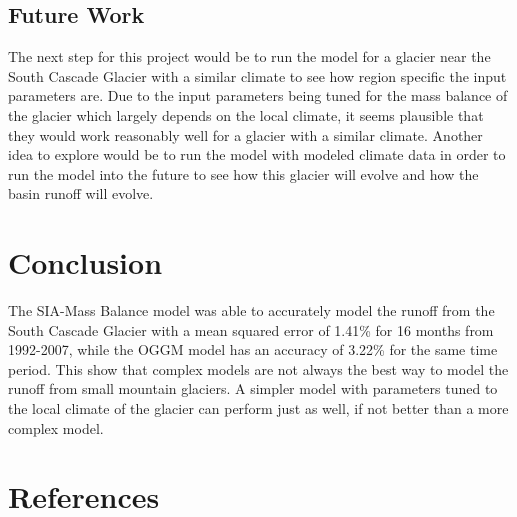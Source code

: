 \documentclass{article}
\begin{document}
\subsection{Future Work}
The next step for this project would be to run the model for a glacier near the South Cascade Glacier with a similar climate to see how region specific the input 
parameters are. Due to the input parameters being tuned for the mass balance of the glacier which largely depends on the local climate, it 
seems plausible that they would work reasonably well for a glacier with a similar climate.
Another idea to explore would be to run the model with modeled climate data in order to run the model into the future to see how this glacier 
will evolve and how the basin runoff will evolve.
\section{Conclusion}
The SIA-Mass Balance model was able to accurately model the runoff from the South Cascade Glacier with a mean squared error of 1.41\% for 16 
months from 1992-2007, while the OGGM model has an accuracy of 3.22\% for the same time period. This show that complex models are not always 
the best way to model the runoff from small mountain glaciers. A simpler model with parameters tuned to the local climate of the glacier can 
perform just as well, if not better than a more complex model. 

\section{References}
\end{document}
